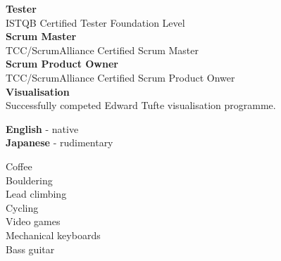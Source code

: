 \documentclass[8pt]{developercv}
\begin{document}
\begin{minipage}[t]{0.3\textwidth}
	\vspace{-\baselineskip} %

	\raggedright

	\textbf{Tester}\\ISTQB Certified Tester Foundation Level\\
	\textbf{Scrum Master}\\TCC/ScrumAlliance Certified Scrum Master\\
	\textbf{Scrum Product Owner}\\TCC/ScrumAlliance Certified Scrum Product Onwer\\
	\textbf{Visualisation}\\Successfully competed Edward Tufte visualisation
	programme.
\end{minipage}
\hfill
\begin{minipage}[t]{0.3\textwidth}
	\vspace{-\baselineskip} %

	\raggedright

	\textbf{English} - native\\
	\textbf{Japanese} - rudimentary
\end{minipage}
\hfill
\begin{minipage}[t]{0.3\textwidth}
	\vspace{-\baselineskip} %

	\raggedright

	Coffee\\
	Bouldering\\
	Lead climbing\\
	Cycling\\
	Video games\\
	Mechanical keyboards\\
	Bass guitar
\end{minipage}
\end{document}

